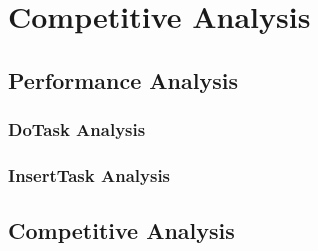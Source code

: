 
\chapter{Competitive Analysis}

\section{Performance Analysis}
\subsection*{DoTask Analysis}
\subsection*{InsertTask Analysis}

\section{Competitive Analysis}
